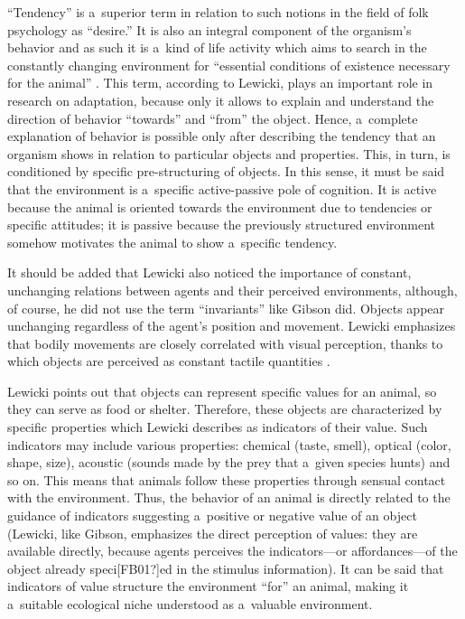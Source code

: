 ``Tendency'' is a~superior term in relation to such notions in the field of folk psychology as ``desire.'' It is also an integral component of the organism's behavior and as such it is a~kind of life activity which aims to search in the constantly changing environment for ``essential conditions of existence necessary for the animal'' 
\parencite[][pp.168–169]{lewicki_procesy_1960}. %
 This term, according to Lewicki, plays an important role in research on adaptation, because only it allows to explain and understand the direction of behavior ``towards'' and ``from'' the object. Hence, a~complete explanation of behavior is possible only after describing the tendency that an organism shows in relation to particular objects and properties. This, in turn, is conditioned by specific pre-structuring of objects. In this sense, it must be said that the environment is a~specific active-passive pole of cognition. It is active because the animal is oriented towards the environment due to tendencies or specific attitudes; it is passive because the previously structured environment somehow motivates the animal to show a~specific tendency.



It should be added that Lewicki also noticed the importance of constant, unchanging relations between agents and their perceived environments, although, of course, he did not use the term ``invariants'' like Gibson did. Objects appear unchanging regardless of the agent's position and movement. Lewicki emphasizes that bodily movements are closely correlated with visual perception, thanks to which objects are perceived as constant tactile quantities 
\parencite[][p.139]{lewicki_procesy_1960}.%




Lewicki points out that objects can represent specific values for an animal, so they can serve as food or shelter. Therefore, these objects are characterized by specific properties which Lewicki describes as indicators of their value. Such indicators may include various properties: chemical (taste, smell), optical (color, shape, size), acoustic (sounds made by the prey that a~given species hunts) and so on. This means that animals follow these properties through sensual contact with the environment. Thus, the behavior of an animal is directly related to the guidance of indicators suggesting a~positive or negative value of an object (Lewicki, like Gibson, emphasizes the direct perception of values: they are available directly, because agents perceives the indicators---or affordances---of the object already speci[FB01?]ed in the stimulus information). It can be said that indicators of value structure the environment ``for'' an animal, making it a~suitable ecological niche understood as a~valuable environment.




